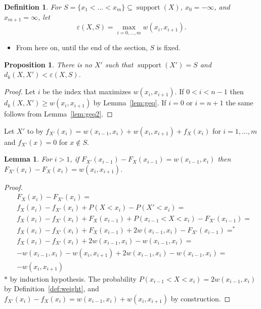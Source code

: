 \documentclass{article}
\newtheorem{lemma}[thm]{Lemma}
\newtheorem{definition}[thm]{Definition}
\newtheorem{proposition}[thm]{Proposition}
\DeclareMathOperator{\support}{support}
\begin{document}
\begin{definition} For $S=\{x_1<\dots<x_m\} \subseteq \support(X)$, $x_0=-\infty$, and $x_{m+1}=\infty$, let
	\[
	\varepsilon(X,S) = \max\limits_{i=0,\dots,m} w(x_{i}, x_{i+1}).
	\]
\end{definition} 

\begin{itemize}
	\item From here on, until the end of the section, $S$ is fixed.
\end{itemize}



\begin{proposition}
	There is no $X'$ such that $\support(X')=S$ and $d_k(X,X') < \varepsilon(X,S)$.
\end{proposition}
\begin{proof}
	Let $i$ be the index that maximizes $w(x_{i}, x_{i+1})$. If $0<i<n-1$ then $d_k(X,X') \geq w(x_{i}, x_{i+1})$ by Lemma~\ref{lem:geq}. If $i=0$ or $i=n+1$ the same follows from Lemma~\ref{lem:geq2}.
\end{proof}

Let $X'$ to by $f_{X'}(x_{i}) = w(x_{i-1},x_i) + w(x_i,x_{i+1}) + f_{X}(x_i)$ for $i=1,\dots,m$ and $f_{X'}(x)=0$ for $x \notin S$.

\begin{lemma}
	For $i>1$, if $F_{X'}(x_{i-1})-F_{X}(x_{i-1}) = w(x_{i-1}, x_{i})$ then $F_{X'}(x_{i})-F_{X}(x_i) = w(x_i, x_{i+1})$.
\end{lemma}
\begin{proof}
	\begin{align}
	&F_X(x_i)-F_{X'}(x_i) = \\
	&f_{X}(x_i) - f_{X'}(x_i) + P(X<x_i) - P(X'<x_i)  = \\ \nonumber
	&f_{X}(x_i) - f_{X'}(x_i) + F_X(x_{i-1}) + P(x_{i-1}< X < x_i)-F_{X'}(x_{i-1}) = \\
	&f_{X}(x_i) - f_{X'}(x_i) + F_X(x_{i-1}) + 2w(x_{i-1},x_{i})-F_{X'}(x_{i-1}) =^* \\
	&f_{X}(x_i) - f_{X'}(x_i) + 2w(x_{i-1},x_{i}) -w(x_{i-1}, x_{i}) = \\
	& -w(x_{i-1},x_i) - w(x_i,x_{i+1}) + 2w(x_{i-1},x_{i}) -w(x_{i-1}, x_{i}) =\\ 
	&- w(x_i,x_{i+1})
	\end{align}
	$*$ by induction hypothesis.
	The probability $P(x_{i-1}< X < x_i) = 2w(x_{i-1},x_{i})$ by Definition~\ref{def:weight}, and
	$f_{X'}(x_i) - f_{X}(x_i) = w(x_{i-1},x_i) + w(x_i,x_{i+1})$ by construction.
\end{proof}
\end{document}
